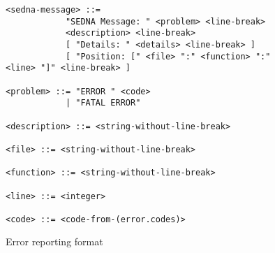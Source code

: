 \documentclass{article}
\begin{document}
\begin{figure}[t]
\centering
\begin{boxedminipage}{\textwidth}
\begin{verbatim}
<sedna-message> ::=
            "SEDNA Message: " <problem> <line-break>
            <description> <line-break>
            [ "Details: " <details> <line-break> ]
            [ "Position: [" <file> ":" <function> ":" <line> "]" <line-break> ]

<problem> ::= "ERROR " <code>
            | "FATAL ERROR"

<description> ::= <string-without-line-break>

<file> ::= <string-without-line-break>

<function> ::= <string-without-line-break>

<line> ::= <integer>

<code> ::= <code-from-(error.codes)>
\end{verbatim}
\end{boxedminipage}
\caption{Error reporting format}
\label{fig:output}
\end{figure}
\end{document}
